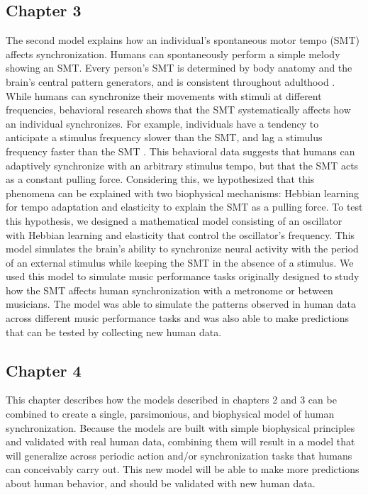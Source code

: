 \documentclass{report}
\begin{document}
\subsection{Chapter 3}
The second model explains how an individual's spontaneous motor tempo (SMT) affects synchronization. Humans can spontaneously perform a simple melody showing an SMT. Every person's SMT is determined by body anatomy and the brain's central pattern generators, and is consistent throughout adulthood \cite{scheurich2018tapping}. While humans can synchronize their movements with stimuli at different frequencies, behavioral research shows that the SMT systematically affects how an individual synchronizes. For example, individuals have a tendency to anticipate a stimulus frequency slower than the SMT, and lag a stimulus frequency faster than the SMT \cite{scheurich2018tapping}. This behavioral data suggests that humans can adaptively synchronize with an arbitrary stimulus tempo, but that the SMT acts as a constant pulling force. Considering this, we hypothesized that this phenomena can be explained with two biophysical mechanisms: Hebbian learning for tempo adaptation and elasticity to explain the SMT as a pulling force. To test this hypothesis, we designed a mathematical model consisting of an oscillator with Hebbian learning and elasticity that control the oscillator's frequency. This model simulates the brain's ability to synchronize neural activity with the period of an external stimulus while keeping the SMT in the absence of a stimulus. We used this model to simulate music performance tasks originally designed to study how the SMT affects human synchronization with a metronome or between musicians. The model was able to simulate the patterns observed in human data across different music performance tasks and was also able to make predictions that can be tested by collecting new human data.

\subsection{Chapter 4}
This chapter describes how the models described in chapters 2 and 3 can be combined to create a single, parsimonious, and biophysical model of human synchronization. Because the models are built with simple biophysical principles and validated with real human data, combining them will result in a model that will generalize across periodic action and/or synchronization tasks that humans can conceivably carry out. This new model will be able to make more predictions about human behavior, and should be validated with new human data.
\end{document}
